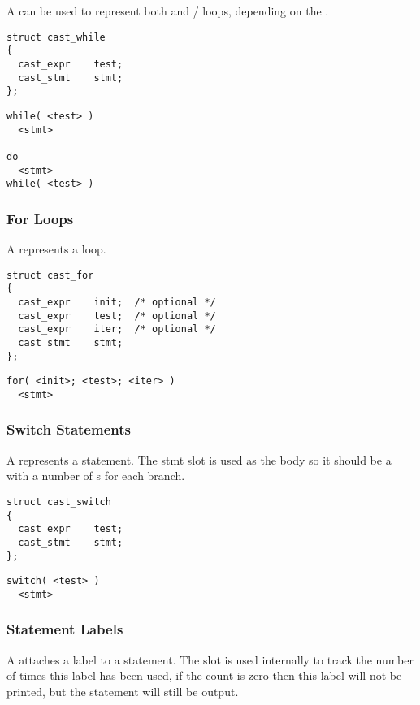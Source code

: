 A  can be used to represent both  and
/ loops, depending on the
.

\begin{verbatim}
struct cast_while
{
  cast_expr    test;
  cast_stmt    stmt;
};
\end{verbatim}

\begin{verbatim}
while( <test> )
  <stmt>

do
  <stmt>
while( <test> )
\end{verbatim}

\subsubsection{For Loops}

A  represents a  loop.

\begin{verbatim}
struct cast_for
{
  cast_expr    init;  /* optional */
  cast_expr    test;  /* optional */
  cast_expr    iter;  /* optional */
  cast_stmt    stmt;
};
\end{verbatim}

\begin{verbatim}
for( <init>; <test>; <iter> )
  <stmt>
\end{verbatim}

\subsubsection{Switch Statements}

A  represents a  statement.  The stmt
slot is used as the body so it should be a  with a number
of s for each branch.

\begin{verbatim}
struct cast_switch
{
  cast_expr    test;
  cast_stmt    stmt;
};
\end{verbatim}

\begin{verbatim}
switch( <test> )
  <stmt>
\end{verbatim}

\subsubsection{Statement Labels}

A  attaches a label to a statement.  The 
slot is used internally to track the number of times this label has been used,
if the count is zero then this label will not be printed, but the statement
will still be output.

